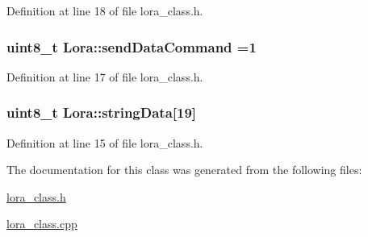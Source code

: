 Definition at line 18 of file lora\+\_\+class.\+h.

\subsubsection[{\texorpdfstring{send\+Data\+Command}{sendDataCommand}}]{\setlength{\rightskip}{0pt plus 5cm}uint8\+\_\+t Lora\+::send\+Data\+Command =1\hspace{0.3cm}{\ttfamily [private]}}\hypertarget{class_lora_ae7af40cf946319a9845222abf177cbdc}{}\label{class_lora_ae7af40cf946319a9845222abf177cbdc}


Definition at line 17 of file lora\+\_\+class.\+h.

\subsubsection[{\texorpdfstring{string\+Data}{stringData}}]{\setlength{\rightskip}{0pt plus 5cm}uint8\+\_\+t Lora\+::string\+Data\mbox{[}19\mbox{]}\hspace{0.3cm}{\ttfamily [private]}}\hypertarget{class_lora_a31a8e6588f109ae8c9dc34f41e55aa39}{}\label{class_lora_a31a8e6588f109ae8c9dc34f41e55aa39}


Definition at line 15 of file lora\+\_\+class.\+h.



The documentation for this class was generated from the following files\+:\begin{DoxyCompactItemize}
\item 
\hyperlink{lora__class_8h}{lora\+\_\+class.\+h}\item 
\hyperlink{lora__class_8cpp}{lora\+\_\+class.\+cpp}\end{DoxyCompactItemize}
